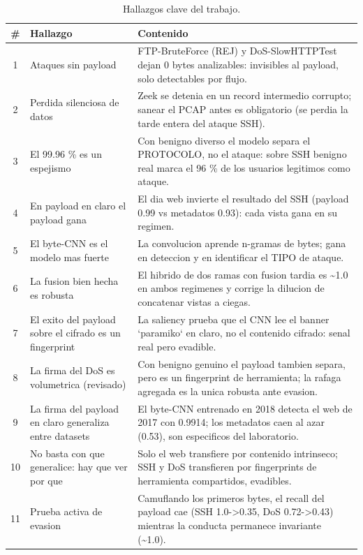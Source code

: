 \begin{table}[htbp]
  \centering
  \caption{Hallazgos clave del trabajo.}
  \label{tab:hallazgos}
  \begin{tabular}{cp{}p{}}
    \toprule
    \textbf{\#} & \textbf{Hallazgo} & \textbf{Contenido} \\
    \midrule
    1 & Ataques sin payload & FTP-BruteForce (REJ) y DoS-SlowHTTPTest dejan 0 bytes analizables: invisibles al payload, solo detectables por flujo. \\
    2 & Perdida silenciosa de datos & Zeek se detenia en un record intermedio corrupto; sanear el PCAP antes es obligatorio (se perdia la tarde entera del ataque SSH). \\
    3 & El 99.96 \% es un espejismo & Con benigno diverso el modelo separa el PROTOCOLO, no el ataque: sobre SSH benigno real marca el 96 \% de los usuarios legitimos como ataque. \\
    4 & En payload en claro el payload gana & El dia web invierte el resultado del SSH (payload 0.99 vs metadatos 0.93): cada vista gana en su regimen. \\
    5 & El byte-CNN es el modelo mas fuerte & La convolucion aprende n-gramas de bytes; gana en deteccion y en identificar el TIPO de ataque. \\
    6 & La fusion bien hecha es robusta & El hibrido de dos ramas con fusion tardia es \textasciitilde{}1.0 en ambos regimenes y corrige la dilucion de concatenar vistas a ciegas. \\
    7 & El exito del payload sobre el cifrado es un fingerprint & La saliency prueba que el CNN lee el banner `paramiko` en claro, no el contenido cifrado: senal real pero evadible. \\
    8 & La firma del DoS es volumetrica (revisado) & Con benigno genuino el payload tambien separa, pero es un fingerprint de herramienta; la rafaga agregada es la unica robusta ante evasion. \\
    9 & La firma del payload en claro generaliza entre datasets & El byte-CNN entrenado en 2018 detecta el web de 2017 con 0.9914; los metadatos caen al azar (0.53), son especificos del laboratorio. \\
    10 & No basta con que generalice: hay que ver por que & Solo el web transfiere por contenido intrinseco; SSH y DoS transfieren por fingerprints de herramienta compartidos, evadibles. \\
    11 & Prueba activa de evasion & Camuflando los primeros bytes, el recall del payload cae (SSH 1.0->0.35, DoS 0.72->0.43) mientras la conducta permanece invariante (\textasciitilde{}1.0). \\

\end{tabular}
\end{table}
